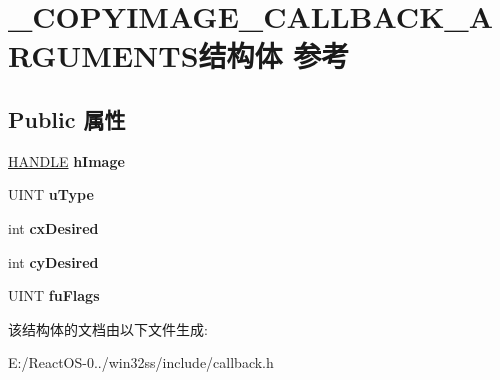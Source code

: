 \hypertarget{struct___c_o_p_y_i_m_a_g_e___c_a_l_l_b_a_c_k___a_r_g_u_m_e_n_t_s}{}\section{\+\_\+\+C\+O\+P\+Y\+I\+M\+A\+G\+E\+\_\+\+C\+A\+L\+L\+B\+A\+C\+K\+\_\+\+A\+R\+G\+U\+M\+E\+N\+T\+S结构体 参考}
\label{struct___c_o_p_y_i_m_a_g_e___c_a_l_l_b_a_c_k___a_r_g_u_m_e_n_t_s}
\subsection*{Public 属性}
\begin{DoxyCompactItemize}
\item 
\mbox{\label{struct___c_o_p_y_i_m_a_g_e___c_a_l_l_b_a_c_k___a_r_g_u_m_e_n_t_s_a896ca343d13846b29ce4751fb514dbfd}} 
\hyperlink{interfacevoid}{H\+A\+N\+D\+LE} {\bfseries h\+Image}
\item 
\mbox{\label{struct___c_o_p_y_i_m_a_g_e___c_a_l_l_b_a_c_k___a_r_g_u_m_e_n_t_s_a9967124b8f874dcb6746c3884d01859f}} 
U\+I\+NT {\bfseries u\+Type}
\item 
\mbox{\label{struct___c_o_p_y_i_m_a_g_e___c_a_l_l_b_a_c_k___a_r_g_u_m_e_n_t_s_a36bf6ccc79b69bc2f1b0d6ee6bda23a3}} 
int {\bfseries cx\+Desired}
\item 
\mbox{\label{struct___c_o_p_y_i_m_a_g_e___c_a_l_l_b_a_c_k___a_r_g_u_m_e_n_t_s_a48a4bab9d86245c6012b6a707dd7b9bc}} 
int {\bfseries cy\+Desired}
\item 
\mbox{\label{struct___c_o_p_y_i_m_a_g_e___c_a_l_l_b_a_c_k___a_r_g_u_m_e_n_t_s_a7fc55988c8b5fa9960688de34c52588c}} 
U\+I\+NT {\bfseries fu\+Flags}
\end{DoxyCompactItemize}


该结构体的文档由以下文件生成\+:\begin{DoxyCompactItemize}
\item 
E\+:/\+React\+O\+S-\/0../win32ss/include/callback.\+h\end{DoxyCompactItemize}
